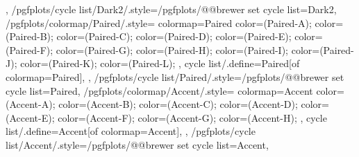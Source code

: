 {{  },
  /pgfplots/cycle list/Dark2/.style={/pgfplots/@@brewer set cycle list={Dark2}},
  /pgfplots/colormap/Paired/.style={
    colormap={Paired}{
      color=(Paired-A);
      color=(Paired-B);
      color=(Paired-C);
      color=(Paired-D);
      color=(Paired-E);
      color=(Paired-F);
      color=(Paired-G);
      color=(Paired-H);
      color=(Paired-I);
      color=(Paired-J);
      color=(Paired-K);
      color=(Paired-L);
    },
    cycle list/.define={Paired}{[of colormap=Paired]},
  },
  /pgfplots/cycle list/Paired/.style={/pgfplots/@@brewer set cycle list={Paired}},
  /pgfplots/colormap/Accent/.style={
    colormap={Accent}{
      color=(Accent-A);
      color=(Accent-B);
      color=(Accent-C);
      color=(Accent-D);
      color=(Accent-E);
      color=(Accent-F);
      color=(Accent-G);
      color=(Accent-H);
    },
    cycle list/.define={Accent}{[of colormap=Accent]},
  },
  /pgfplots/cycle list/Accent/.style={/pgfplots/@@brewer set cycle list={Accent}},
}


